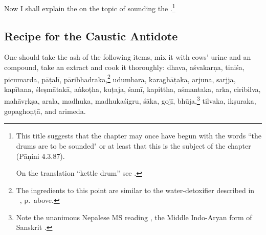 \begin{translation}
    
    \item[1] 
    
Now I shall explain the  on the topic of
sounding the .\footnote{This title suggests
    that the chapter may once have begun with the words “the drums are to
    be sounded" or at least that this is the subject of the chapter
    (Pāṇini 4.3.87).
    
On the translation “kettle drum” see \cites[318]{hopk-1889}{ross-2014}.}
 
 \subsection{Recipe for the Caustic Antidote}   
    \item[3] 
    
One should take the ash of the following items, mix it with cows'
urine and an  compound, take an extract and cook
it thoroughly: %
\gls{dhava}, \gls{aśvakarṇa}, \gls{tiniśa}, \gls{picumarda},
\gls{pāṭalī}, \gls{pāribhadraka},\footnote{\label{drum-detox}The
    ingredients to this point are similar to the water-detoxifier
    described in \SS\ , p.\,\pageref{water-detox} above.}
    \gls{udumbara}, \gls{karaghāṭaka}, \gls{arjuna}, \gls{sarjja},
    \gls{kapītana}, \gls{śleṣmātakā}, \gls{aṅkoṭha}, \gls{kuṭaja},
    \gls{śamī}, \gls{kapittha}, \gls{aśmantaka}, \gls{arka},
    \gls{ciribilva}, \gls{mahāvṛkṣa}, \gls{arala}, \gls{madhuka},
    \gls{madhukaśigru}, \gls{śāka}, \gls{gojī},
    \gls{bhūja},\footnote{Note the unanimous Nepalese MS reading
        , the Middle Indo-Aryan form of Sanskrit 
        \citep[\#9570]{CDIAL}.} \gls{tilvaka}, \gls{ikṣuraka},
        \gls{gopaghoṇṭā}, and \gls{arimeda}.
     

\end{translation}
